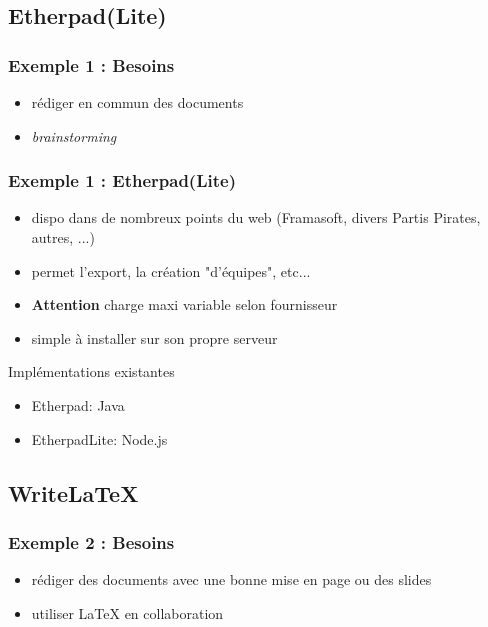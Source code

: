 \documentclass{beamer}
\begin{document}
\subsection{Etherpad(Lite)} %

\begin{frame}
    \frametitle{Exemple 1 : Besoins}

    \begin{itemize}
        \item rédiger en commun des documents
        \item \textit{brainstorming}
    \end{itemize}

\end{frame}


\begin{frame}
    \frametitle{Exemple 1 : Etherpad(Lite)}

    \begin{itemize}
        \item dispo dans de nombreux points du web (Framasoft, divers Partis Pirates, autres, ...)
        \item permet l'export, la création "d'équipes", etc...
        \item \textbf{Attention} charge maxi variable selon fournisseur
        \item simple à installer sur son propre serveur
    \end{itemize}

    \begin{block}{Implémentations existantes}
        \begin{itemize}
            \item Etherpad: Java
            \item EtherpadLite: Node.js
        \end{itemize}
    \end{block}


\end{frame}

\subsection{Write\LaTeX} %

\begin{frame}
    \frametitle{Exemple 2 : Besoins}

    \begin{itemize}
        \item rédiger des documents avec une bonne mise en page ou des slides
        \item utiliser \LaTeX{} en collaboration
    \end{itemize}

\end{frame}
\end{document}

